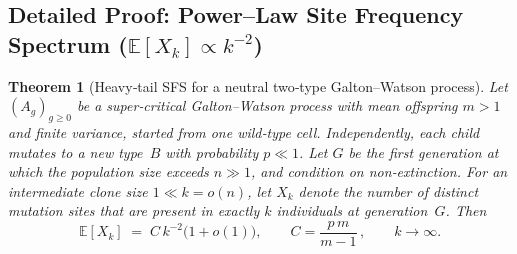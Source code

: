 \documentclass[11pt]{article}
\newtheorem{theorem}{Theorem} %
\begin{document}
\subsection{Detailed Proof: Power--Law Site Frequency Spectrum ($\mathbb{E}[X_k]\propto k^{-2}$)}
\begin{theorem}[Heavy‑tail SFS for a neutral two‑type Galton--Watson process]
\label{thm:SFS-k2}
Let $(A_g)_{g\ge0}$ be a super‑critical Galton--Watson process with
mean offspring $m>1$ and finite variance, started from one wild‑type
cell.  Independently, each child mutates to a new type~$B$ with
probability $p\ll1$.  Let $G$ be the first generation at which the
population size exceeds $n\gg1$, and condition on non‑extinction.
For an intermediate clone size $1\ll k=o(n)$, let $X_k$ denote the
number of distinct mutation sites that are present in exactly $k$
individuals at generation~$G$.  Then
\[
\mathbb{E}[X_k]\;=\;C\,k^{-2}\bigl(1+o(1)\bigr), \qquad
C=\frac{p\,m}{m-1}\,,
\qquad k\to\infty.
\]
\end{theorem}
\end{document}
